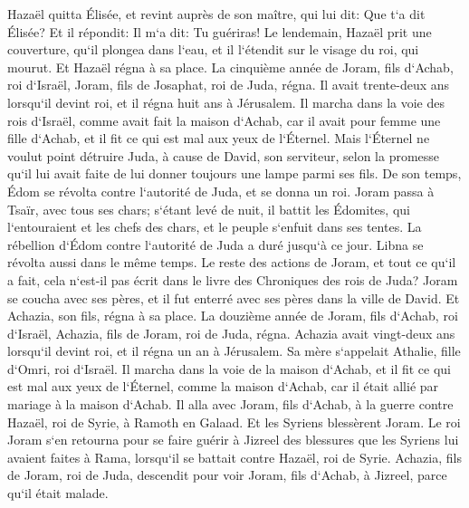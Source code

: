 \verse Hazaël quitta Élisée, et revint auprès de son maître, qui lui dit: Que t`a dit Élisée? Et il répondit: Il m`a dit: Tu guériras! 
\verse Le lendemain, Hazaël prit une couverture, qu`il plongea dans l`eau, et il l`étendit sur le visage du roi, qui mourut. Et Hazaël régna à sa place. 
\verse La cinquième année de Joram, fils d`Achab, roi d`Israël, Joram, fils de Josaphat, roi de Juda, régna. 
\verse Il avait trente-deux ans lorsqu`il devint roi, et il régna huit ans à Jérusalem. 
\verse Il marcha dans la voie des rois d`Israël, comme avait fait la maison d`Achab, car il avait pour femme une fille d`Achab, et il fit ce qui est mal aux yeux de l`Éternel. 
\verse Mais l`Éternel ne voulut point détruire Juda, à cause de David, son serviteur, selon la promesse qu`il lui avait faite de lui donner toujours une lampe parmi ses fils. 
\verse De son temps, Édom se révolta contre l`autorité de Juda, et se donna un roi. 
\verse Joram passa à Tsaïr, avec tous ses chars; s`étant levé de nuit, il battit les Édomites, qui l`entouraient et les chefs des chars, et le peuple s`enfuit dans ses tentes. 
\verse La rébellion d`Édom contre l`autorité de Juda a duré jusqu`à ce jour. Libna se révolta aussi dans le même temps. 
\verse Le reste des actions de Joram, et tout ce qu`il a fait, cela n`est-il pas écrit dans le livre des Chroniques des rois de Juda? 
\verse Joram se coucha avec ses pères, et il fut enterré avec ses pères dans la ville de David. Et Achazia, son fils, régna à sa place. 
\verse La douzième année de Joram, fils d`Achab, roi d`Israël, Achazia, fils de Joram, roi de Juda, régna. 
\verse Achazia avait vingt-deux ans lorsqu`il devint roi, et il régna un an à Jérusalem. Sa mère s`appelait Athalie, fille d`Omri, roi d`Israël. 
\verse Il marcha dans la voie de la maison d`Achab, et il fit ce qui est mal aux yeux de l`Éternel, comme la maison d`Achab, car il était allié par mariage à la maison d`Achab. 
\verse Il alla avec Joram, fils d`Achab, à la guerre contre Hazaël, roi de Syrie, à Ramoth en Galaad. Et les Syriens blessèrent Joram. 
\verse Le roi Joram s`en retourna pour se faire guérir à Jizreel des blessures que les Syriens lui avaient faites à Rama, lorsqu`il se battait contre Hazaël, roi de Syrie. Achazia, fils de Joram, roi de Juda, descendit pour voir Joram, fils d`Achab, à Jizreel, parce qu`il était malade. 

